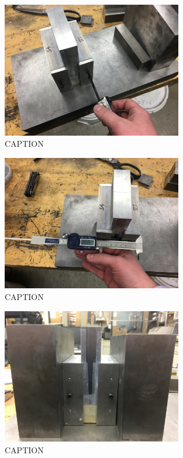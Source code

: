 \clearpage

\begin{figure}
	\centering
        \includegraphics[width=0.7\textwidth]{appendix_sample_prep/dds_side_shields.jpg}
   	\caption{CAPTION}
  	\label{Fig:dds_side_shields}
\end{figure}

\begin{figure}
	\centering
        \includegraphics[width=0.7\textwidth]{appendix_sample_prep/dds_measure_sample.jpg}
   	\caption{CAPTION}
  	\label{Fig:dds_measure_sample}
\end{figure}

\begin{figure}
	\centering
        \includegraphics[width=0.7\textwidth]{appendix_sample_prep/dds_store_sample.jpg}
   	\caption{CAPTION}
  	\label{Fig:dds_store_sample}
\end{figure}


